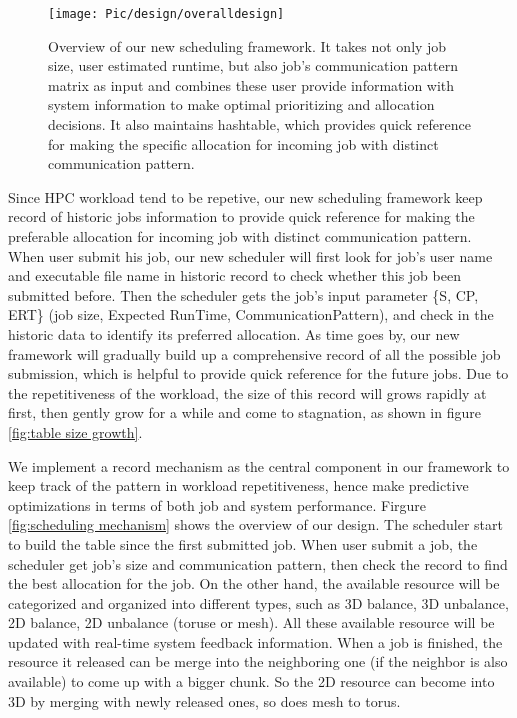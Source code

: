 \documentclass[conference]{IEEEtran}
\begin{document}
\begin{figure}[h!]     
\centering  
\texttt{[image: Pic/design/overalldesign]}  
\caption{Overview of our new scheduling framework. It takes not only job size, user estimated runtime, but also job's communication pattern matrix as input and combines these user provide information with system information to make optimal prioritizing and allocation decisions. It also maintains hashtable, which provides quick reference for making the specific allocation for incoming job with distinct communication pattern. }
\label{fig:overall design}
\end{figure}


Since HPC workload tend to be repetive, our new scheduling framework keep record of historic jobs information to provide quick reference for making the preferable allocation for incoming job with distinct communication pattern. When user submit his job, our new scheduler will first look for job's user name and executable file name in historic record to check whether this job been submitted before. Then the scheduler gets the job's input parameter \{S, CP, ERT\} (job size, Expected RunTime, CommunicationPattern),  and check in the historic data to identify its preferred allocation. As time goes by, our new framework will gradually build up a comprehensive record of all the possible job submission, which is helpful to provide quick reference for the future jobs. Due to the repetitiveness of the workload, the size of this record will grows rapidly at first, then gently grow for a while and come to stagnation, as shown in figure
\ref{fig:table size growth}. 



We implement a record mechanism as the central component in our framework to keep track of the pattern in workload repetitiveness, hence make predictive optimizations in terms of both job and system performance. Firgure \ref{fig:scheduling mechanism} shows the overview of our design. The scheduler start to build the table since the first submitted job. When user submit a job, the scheduler get job's size and communication pattern, then check the record to find the best allocation for the job. On the other hand, the available resource will be categorized and organized into different types, such as 3D balance, 3D unbalance, 2D balance, 2D unbalance (toruse or mesh). All these available resource will be updated with real-time system feedback information. When a job is finished, the resource it released can be merge into the neighboring one (if the neighbor is also available) to come up with a bigger chunk. So the 2D resource can become into 3D by merging with newly released ones, so does mesh to torus.
\end{document}

